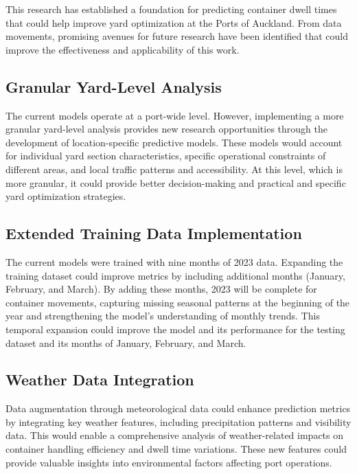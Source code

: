 		This research has established a foundation for predicting container dwell times that could help improve yard
		optimization at the Ports of Auckland. From data movements, promising avenues for future research have been
		identified that could improve the effectiveness and applicability of this work.

		\subsection{Granular Yard-Level Analysis}

			The current models operate at a port-wide level. However, implementing a more granular yard-level analysis
			provides new research opportunities through the development of location-specific predictive models. These
			models would account for individual yard section characteristics, specific operational constraints of
			different areas, and local traffic patterns and accessibility. At this level, which is more granular, it
			could provide better decision-making and practical and specific yard optimization strategies.

		\subsection{Extended Training Data Implementation}

			The current models were trained with nine months of 2023 data. Expanding the training dataset could improve
			metrics by including additional months (January, February, and March). By adding these months, 2023 will be
			complete for container movements, capturing missing seasonal patterns at the beginning of the year and
			strengthening the model's understanding of monthly trends. This temporal expansion could improve the model
			and its performance for the testing dataset and its months of January, February, and March.

		\subsection{Weather Data Integration}

			Data augmentation through meteorological data could enhance prediction metrics by integrating key weather
			features, including precipitation patterns and visibility data. This would enable a comprehensive analysis
			of weather-related impacts on container handling efficiency and dwell time variations. These new features
			could provide valuable insights into environmental factors affecting port operations.


